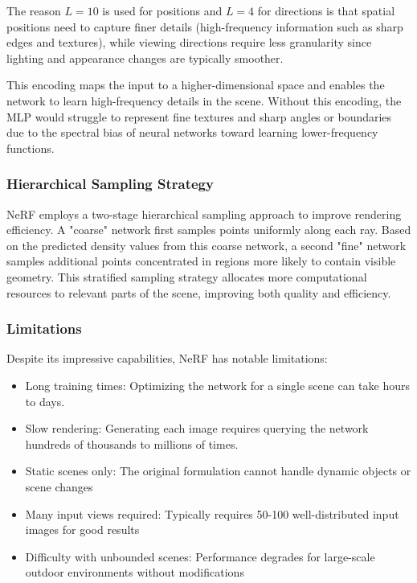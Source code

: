 \documentclass[conference]{IEEEtran}
\begin{document}
The reason $L=10$ is used for positions and $L=4$ for directions is that spatial positions need to capture finer details (high-frequency information such as sharp edges and textures), while viewing directions require less granularity since lighting and appearance changes are typically smoother.~\cite{nerf_paper_p7}~\cite{nerf_paper_p8}

This encoding maps the input to a higher-dimensional space and enables the network to learn high-frequency details in the scene. Without this encoding, the MLP would struggle to represent fine textures and sharp angles or boundaries due to the spectral bias of neural networks toward learning lower-frequency functions.~\cite{nerf_paper_p8}

\subsubsection{Hierarchical Sampling Strategy}

NeRF employs a two-stage hierarchical sampling approach to improve rendering efficiency. A "coarse" network first samples points uniformly along each ray. Based on the predicted density values from this coarse network, a second "fine" network samples additional points concentrated in regions more likely to contain visible geometry. This stratified sampling strategy allocates more computational resources to relevant parts of the scene, improving both quality and efficiency.~\cite{nerf_paper_p8}

\subsubsection{Limitations}

Despite its impressive capabilities, NeRF has notable limitations:

\begin{itemize}
    \item Long training times: Optimizing the network for a single scene can take hours to days.
    \item Slow rendering: Generating each image requires querying the network hundreds of thousands to millions of times.
    \item Static scenes only: The original formulation cannot handle dynamic objects or scene changes
    \item Many input views required: Typically requires 50-100 well-distributed input images for good results
    \item Difficulty with unbounded scenes: Performance degrades for large-scale outdoor environments without modifications
\end{itemize}~\cite{nerf_paper_p13}
\end{document}
